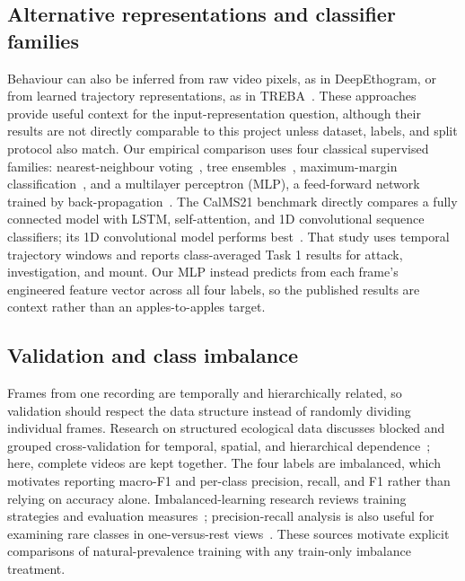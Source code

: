 \documentclass[conference]{IEEEtran}
\begin{document}
\subsection{Alternative representations and classifier families}
Behaviour can also be inferred from raw video pixels, as in DeepEthogram, or from learned trajectory representations, as in TREBA~\cite{bohnslav2021deepethogram,sun2021treba}. These approaches provide useful context for the input-representation question, although their results are not directly comparable to this project unless dataset, labels, and split protocol also match. Our empirical comparison uses four classical supervised families: nearest-neighbour voting~\cite{cover1967nearest}, tree ensembles~\cite{breiman2001random}, maximum-margin classification~\cite{cortes1995support}, and a multilayer perceptron (MLP), a feed-forward network trained by back-propagation~\cite{rumelhart1986learning}. The CalMS21 benchmark directly compares a fully connected model with LSTM, self-attention, and 1D convolutional sequence classifiers; its 1D convolutional model performs best~\cite{sun2021calms21}. That study uses temporal trajectory windows and reports class-averaged Task 1 results for attack, investigation, and mount. Our MLP instead predicts from each frame's engineered feature vector across all four labels, so the published results are context rather than an apples-to-apples target.

\subsection{Validation and class imbalance}
Frames from one recording are temporally and hierarchically related, so validation should respect the data structure instead of randomly dividing individual frames. Research on structured ecological data discusses blocked and grouped cross-validation for temporal, spatial, and hierarchical dependence~\cite{roberts2017crossvalidation}; here, complete videos are kept together. The four labels are imbalanced, which motivates reporting macro-F1 and per-class precision, recall, and F1 rather than relying on accuracy alone. Imbalanced-learning research reviews training strategies and evaluation measures~\cite{he2009imbalanced,sokolova2009metrics}; precision-recall analysis is also useful for examining rare classes in one-versus-rest views~\cite{saito2015precisionrecall}. These sources motivate explicit comparisons of natural-prevalence training with any train-only imbalance treatment.
\end{document}

